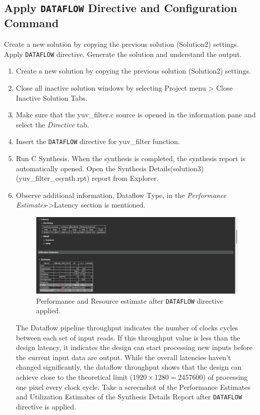 \documentclass[a4paper,12pt,twoside]{article}
\begin{document}
\subsection{Apply \texttt{DATAFLOW} Directive and Configuration Command}\label{S25}
Create a new solution by copying the previous solution (Solution2) settings. Apply \texttt{DATAFLOW} directive. Generate the solution and understand the output.
\begin{enumerate}
    \item Create a new solution by copying the previous solution (Solution2) settings.
    \item Close all inactive solution windows by selecting Project menu > Close Inactive Solution Tabs.
    \item Make sure that the yuv\_filter.c source is opened in the information pane and select the \textit{Directive} tab.
    \item Insert the \texttt{DATAFLOW} directive for yuv\_filter function.
    \item Run C Synthesis. When the synthesis is completed, the synthesis report is automatically opened. Open the Synthesis Details(solution3)(yuv\_filter\_csynth.rpt) report from Explorer.
    \item Observe additional information, Dataflow Type, in the \textit{Performance Estimates}->Latency section is mentioned.
    \begin{figure}[H]
        \centering
        \includegraphics[width=\textwidth]{images/7.png}
        \caption{Performance and Resource estimate after \texttt{DATAFLOW} directive applied.}
    \end{figure}
    The Dataflow pipeline throughput indicates the number of clocks cycles between each set of input reads. If this throughput value is less than the design latency, it indicates the design can start processing new inputs before the current input data are output. While the overall latencies haven’t changed significantly, the dataflow throughput shows that the design can achieve close to the theoretical limit ($1920\times1280=2457600$) of processing one pixel every clock cycle. Take a screenshot of the Performance Estimates and Utilization Estimates of the Synthesis Details Report after \texttt{DATAFLOW} directive is applied.

\end{enumerate}
\end{document}
